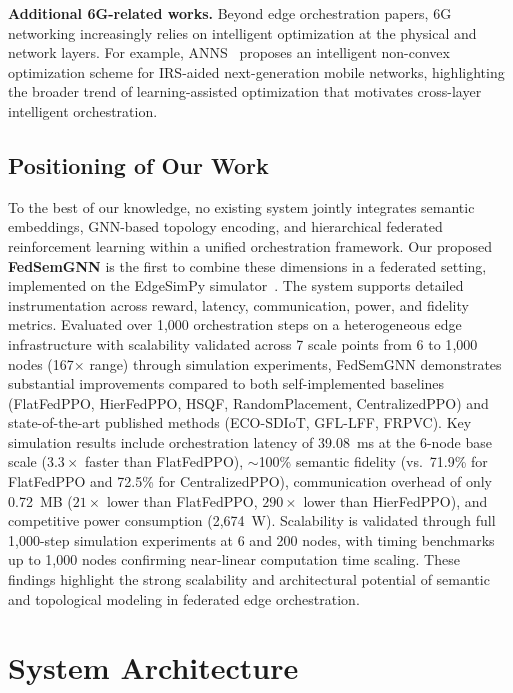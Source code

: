 \documentclass[conference]{IEEEtran}
\begin{document}
	\noindent\textbf{Additional 6G-related works.} Beyond edge orchestration papers, 6G networking increasingly relies on intelligent optimization at the physical and network layers. For example, ANNS~\cite{chen2025anns} proposes an intelligent non-convex optimization scheme for IRS-aided next-generation mobile networks, highlighting the broader trend of learning-assisted optimization that motivates cross-layer intelligent orchestration.
	
	
	\subsection{Positioning of Our Work}
	
	To the best of our knowledge, no existing system jointly integrates semantic embeddings, GNN-based topology encoding, and hierarchical federated reinforcement learning within a unified orchestration framework. Our proposed \textbf{FedSemGNN} is the first to combine these dimensions in a federated setting, implemented on the EdgeSimPy simulator~\cite{souza2023edgesimpy}. The system supports detailed instrumentation across reward, latency, communication, power, and fidelity metrics. Evaluated over 1,000 orchestration steps on a heterogeneous edge infrastructure with scalability validated across 7 scale points from 6 to 1{,}000 nodes (167$\times$ range) through simulation experiments, FedSemGNN demonstrates substantial improvements compared to both self-implemented baselines (FlatFedPPO, HierFedPPO, HSQF, RandomPlacement, CentralizedPPO) and state-of-the-art published methods (ECO-SDIoT, GFL-LFF, FRPVC). Key simulation results include orchestration latency of 39.08~ms at the 6-node base scale ($3.3\times$ faster than FlatFedPPO), $\sim$100\% semantic fidelity (vs.\ 71.9\% for FlatFedPPO and 72.5\% for CentralizedPPO), communication overhead of only 0.72~MB ($21\times$ lower than FlatFedPPO, $290\times$ lower than HierFedPPO), and competitive power consumption (2{,}674~W). Scalability is validated through full 1{,}000-step simulation experiments at 6 and 200 nodes, with timing benchmarks up to 1{,}000 nodes confirming near-linear computation time scaling. These findings highlight the strong scalability and architectural potential of semantic and topological modeling in federated edge orchestration.
	
	
	\section{System Architecture}
	\label{sec:system_architecture}
	
\end{document}
